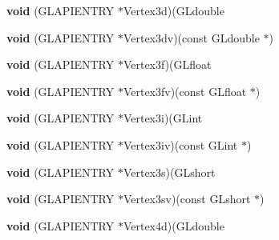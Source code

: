 \begin{DoxyCompactItemize}
\item 
\mbox{\label{struct_____g_ldispatch_table_rec_a200116de7bed1fca641904bde89735e1}} 
{\bfseries void} (G\+L\+A\+P\+I\+E\+N\+T\+RY $\ast$Vertex3d)(G\+Ldouble
\item 
\mbox{\label{struct_____g_ldispatch_table_rec_aac58fec1927480a1deae09c9c7366e2e}} 
{\bfseries void} (G\+L\+A\+P\+I\+E\+N\+T\+RY $\ast$Vertex3dv)(const G\+Ldouble $\ast$)
\item 
\mbox{\label{struct_____g_ldispatch_table_rec_a5484b2a8787ce8bbebf36c4d40a27fca}} 
{\bfseries void} (G\+L\+A\+P\+I\+E\+N\+T\+RY $\ast$Vertex3f)(G\+Lfloat
\item 
\mbox{\label{struct_____g_ldispatch_table_rec_a6ec1d313358add078b5a9fd96cb703e2}} 
{\bfseries void} (G\+L\+A\+P\+I\+E\+N\+T\+RY $\ast$Vertex3fv)(const G\+Lfloat $\ast$)
\item 
\mbox{\label{struct_____g_ldispatch_table_rec_a08ce4122e7ef6a5d0b7baf1c7389a93f}} 
{\bfseries void} (G\+L\+A\+P\+I\+E\+N\+T\+RY $\ast$Vertex3i)(G\+Lint
\item 
\mbox{\label{struct_____g_ldispatch_table_rec_a9688eeb86be95a162e1d938c271b88f7}} 
{\bfseries void} (G\+L\+A\+P\+I\+E\+N\+T\+RY $\ast$Vertex3iv)(const G\+Lint $\ast$)
\item 
\mbox{\label{struct_____g_ldispatch_table_rec_aa18318c8e7e62987b76f51eaf8b7761f}} 
{\bfseries void} (G\+L\+A\+P\+I\+E\+N\+T\+RY $\ast$Vertex3s)(G\+Lshort
\item 
\mbox{\label{struct_____g_ldispatch_table_rec_a8f5c72a8f4fb1eb66a552aa88a623e82}} 
{\bfseries void} (G\+L\+A\+P\+I\+E\+N\+T\+RY $\ast$Vertex3sv)(const G\+Lshort $\ast$)
\item 
\mbox{\label{struct_____g_ldispatch_table_rec_a13d9571474d3036bfb434084ff07209b}} 
{\bfseries void} (G\+L\+A\+P\+I\+E\+N\+T\+RY $\ast$Vertex4d)(G\+Ldouble
\item 

\end{DoxyCompactItemize}
